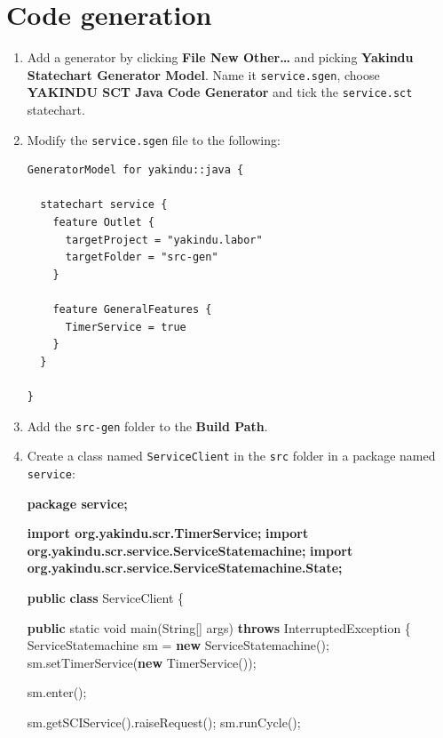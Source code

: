 \documentclass[]{report}
\newenvironment{Shaded}{}{}
\newcommand{\KeywordTok}[1]{\textcolor[rgb]{0.00,0.44,0.13}{\textbf{{#1}}}}
\newcommand{\DataTypeTok}[1]{\textcolor[rgb]{0.56,0.13,0.00}{{#1}}}
\newcommand{\FunctionTok}[1]{\textcolor[rgb]{0.02,0.16,0.49}{{#1}}}
\newcommand{\NormalTok}[1]{{#1}}
\begin{document}
\section{Code generation}

\begin{enumerate}
\def\labelenumi{\arabic{enumi}.}
\item
  Add a generator by clicking \textbf{File \textbar{} New \textbar{}
  Other\ldots{}} and picking \textbf{Yakindu Statechart Generator
  Model}. Name it \texttt{service.sgen}, choose \textbf{YAKINDU SCT Java
  Code Generator} and tick the \texttt{service.sct} statechart.
\item
  Modify the \texttt{service.sgen} file to the following:

\begin{verbatim}
GeneratorModel for yakindu::java {

  statechart service {
    feature Outlet {
      targetProject = "yakindu.labor"
      targetFolder = "src-gen"
    }

    feature GeneralFeatures {
      TimerService = true
    }
  }

}
\end{verbatim}
\item
  Add the \texttt{src-gen} folder to the \textbf{Build Path}.
\item
  Create a class named \texttt{ServiceClient} in the \texttt{src} folder
  in a package named \texttt{service}:

\begin{Shaded}
\begin{Highlighting}[]
\KeywordTok{package service;}

\KeywordTok{import org.yakindu.scr.TimerService;}
\KeywordTok{import org.yakindu.scr.service.ServiceStatemachine;}
\KeywordTok{import org.yakindu.scr.service.ServiceStatemachine.State;}

\KeywordTok{public} \KeywordTok{class} \NormalTok{ServiceClient \{}

  \KeywordTok{public} \DataTypeTok{static} \DataTypeTok{void} \FunctionTok{main}\NormalTok{(String[] args) }\KeywordTok{throws} \NormalTok{InterruptedException \{}
    \NormalTok{ServiceStatemachine sm = }\KeywordTok{new} \FunctionTok{ServiceStatemachine}\NormalTok{();}
    \NormalTok{sm.}\FunctionTok{setTimerService}\NormalTok{(}\KeywordTok{new} \FunctionTok{TimerService}\NormalTok{());}

    \NormalTok{sm.}\FunctionTok{enter}\NormalTok{();}

    \NormalTok{sm.}\FunctionTok{getSCIService}\NormalTok{().}\FunctionTok{raiseRequest}\NormalTok{();}
    \NormalTok{sm.}\FunctionTok{runCycle}\NormalTok{();}


\end{Highlighting}
\end{Shaded}
\end{enumerate}
\end{document}
